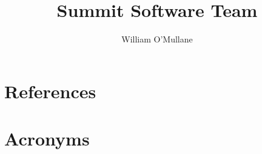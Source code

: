 \documentclass[OPS,lsstdraft,authoryear,toc]{lsstdoc}
\title{Summit Software Team}
\author{%
William O'Mullane
}
\date{\vcsDate}
\begin{document}
\mkshorttitle




\appendix
\section{References} \label{sec:bib}
\renewcommand{\refname}{} %


\section{Acronyms} \label{sec:acronyms}
%
\printglossaries
\end{document}
